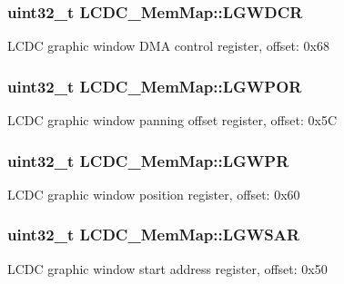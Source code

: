 \subsubsection[{L\+G\+W\+D\+C\+R}]{\setlength{\rightskip}{0pt plus 5cm}uint32\+\_\+t L\+C\+D\+C\+\_\+\+Mem\+Map\+::\+L\+G\+W\+D\+C\+R}\label{struct_l_c_d_c___mem_map_aef253853dccb165217b00da5fbe3b95f}
L\+C\+D\+C graphic window D\+M\+A control register, offset\+: 0x68 \hypertarget{struct_l_c_d_c___mem_map_af8ab91fa9f984a56dfa54a55f0fc90e7}{}
\subsubsection[{L\+G\+W\+P\+O\+R}]{\setlength{\rightskip}{0pt plus 5cm}uint32\+\_\+t L\+C\+D\+C\+\_\+\+Mem\+Map\+::\+L\+G\+W\+P\+O\+R}\label{struct_l_c_d_c___mem_map_af8ab91fa9f984a56dfa54a55f0fc90e7}
L\+C\+D\+C graphic window panning offset register, offset\+: 0x5\+C \hypertarget{struct_l_c_d_c___mem_map_a8f4192a93512b0a04c71bd2f8d92590f}{}
\subsubsection[{L\+G\+W\+P\+R}]{\setlength{\rightskip}{0pt plus 5cm}uint32\+\_\+t L\+C\+D\+C\+\_\+\+Mem\+Map\+::\+L\+G\+W\+P\+R}\label{struct_l_c_d_c___mem_map_a8f4192a93512b0a04c71bd2f8d92590f}
L\+C\+D\+C graphic window position register, offset\+: 0x60 \hypertarget{struct_l_c_d_c___mem_map_a31fb3217bf9eb1ecda85e0c2769c955d}{}
\subsubsection[{L\+G\+W\+S\+A\+R}]{\setlength{\rightskip}{0pt plus 5cm}uint32\+\_\+t L\+C\+D\+C\+\_\+\+Mem\+Map\+::\+L\+G\+W\+S\+A\+R}\label{struct_l_c_d_c___mem_map_a31fb3217bf9eb1ecda85e0c2769c955d}
L\+C\+D\+C graphic window start address register, offset\+: 0x50 \hypertarget{struct_l_c_d_c___mem_map_a3866d5fe438c9aeca7f50a30148aaee9}{}
